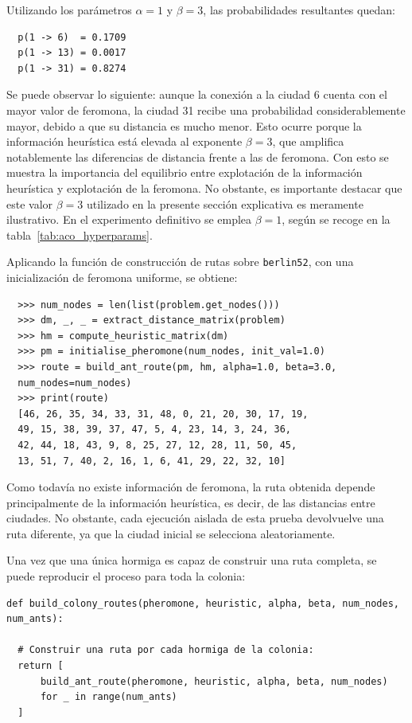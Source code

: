 Utilizando los parámetros $\alpha = 1 $ y $\beta = 3$, las probabilidades resultantes quedan:
\begin{verbatim}
  p(1 -> 6)  = 0.1709
  p(1 -> 13) = 0.0017
  p(1 -> 31) = 0.8274
\end{verbatim}

Se puede observar lo siguiente: aunque la conexión a la ciudad 6 cuenta con el mayor valor de feromona, la ciudad 31 
recibe una probabilidad considerablemente mayor, debido a que su distancia es mucho menor. Esto ocurre porque la información
heurística está elevada al exponente $\beta = 3$, que amplifica notablemente las diferencias de distancia frente a las de 
feromona. Con esto se muestra la importancia del equilibrio entre explotación de la información heurística y explotación de la
feromona. No obstante, es importante destacar que este valor $\beta = 3$ utilizado en la presente sección explicativa es
meramente ilustrativo. En el experimento definitivo se emplea $\beta = 1$, según se recoge en la 
tabla~\ref{tab:aco_hyperparams}.

Aplicando la función de construcción de rutas sobre \texttt{berlin52}, con una inicialización de feromona uniforme, se obtiene:
\begin{verbatim}
  >>> num_nodes = len(list(problem.get_nodes()))
  >>> dm, _, _ = extract_distance_matrix(problem)
  >>> hm = compute_heuristic_matrix(dm)
  >>> pm = initialise_pheromone(num_nodes, init_val=1.0)
  >>> route = build_ant_route(pm, hm, alpha=1.0, beta=3.0, 
  num_nodes=num_nodes)
  >>> print(route)
  [46, 26, 35, 34, 33, 31, 48, 0, 21, 20, 30, 17, 19, 
  49, 15, 38, 39, 37, 47, 5, 4, 23, 14, 3, 24, 36, 
  42, 44, 18, 43, 9, 8, 25, 27, 12, 28, 11, 50, 45, 
  13, 51, 7, 40, 2, 16, 1, 6, 41, 29, 22, 32, 10]
\end{verbatim}

Como todavía no existe información de feromona, la ruta obtenida depende principalmente de la información heurística, es
decir, de las distancias entre ciudades. No obstante, cada ejecución aislada de esta prueba devolvuelve una ruta diferente,
ya que la ciudad inicial se selecciona aleatoriamente.

Una vez que una única hormiga es capaz de construir una ruta completa, se puede reproducir el proceso para toda la colonia:
\newline
\begin{lstlisting}[style=PythonStyle]
def build_colony_routes(pheromone, heuristic, alpha, beta, num_nodes, num_ants):
 
  # Construir una ruta por cada hormiga de la colonia:
  return [
      build_ant_route(pheromone, heuristic, alpha, beta, num_nodes)
      for _ in range(num_ants)
  ]
\end{lstlisting}

